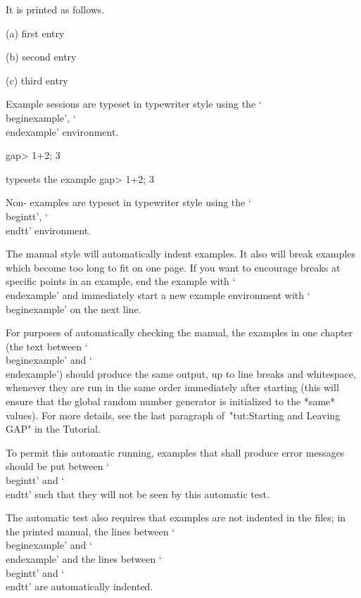 It is printed as follows.
\beginlist
\item{(a)}
    first entry
\item{(b)}
    second entry
\item{(c)}
    third entry
\endlist

Example {\GAP} sessions are typeset in typewriter style
using the `\\beginexample', `\\endexample' environment.

\begintt
\beginexample
gap> 1+2;
3
\endexample
\endtt

typesets the example
\beginexample
gap> 1+2;
3
\endexample

Non-{\GAP} examples are typeset in typewriter style
using the `\\begintt', `\\endtt' environment.

The manual style will automatically indent examples. It also will break
examples which become too long to fit on one page. If you want to encourage
breaks at specific points in an example, end the example with `\\endexample'
and immediately start a new example environment with `\\beginexample' on
the next line.


For purposes of automatically checking the manual,
the {\GAP} examples in one chapter (the text between `\\beginexample'
and `\\endexample') should produce the same output, up to line breaks
and whitespace, whenever they are run in the same order
immediately after starting {\GAP}
(this will ensure that the global random number generator is initialized
to the *same* values).
For more details,
see the last paragraph of~"tut:Starting and Leaving GAP" in the Tutorial.

To permit this automatic running,
examples that shall produce error messages should be put between
`\\begintt' and `\\endtt'
such that they will not be seen by this automatic test.

The automatic test also requires that examples are not indented
in the files;
in the printed manual,
the lines between `\\beginexample' and `\\endexample'
and the lines between `\\begintt' and `\\endtt' are automatically
indented.

